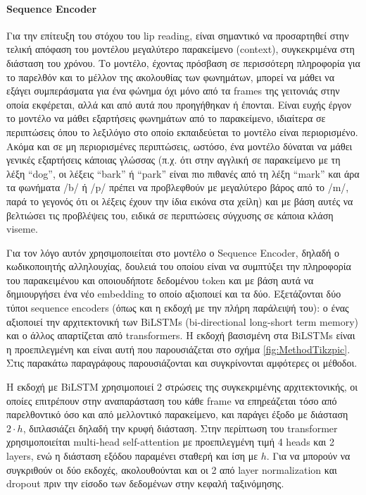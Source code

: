 \paragraph{Sequence Encoder}

Για την επίτευξη του στόχου του lip reading, είναι σημαντικό να προσαρτηθεί στην τελική απόφαση του μοντέλου μεγαλύτερο παρακείμενο (context), συγκεκριμένα στη διάσταση του χρόνου. Το μοντέλο, έχοντας πρόσβαση σε περισσότερη πληροφορία για το παρελθόν και το μέλλον της ακολουθίας των φωνημάτων, μπορεί να μάθει να εξάγει συμπεράσματα για ένα φώνημα όχι μόνο από τα frames της γειτονιάς στην οποία εκφέρεται, αλλά και από αυτά που προηγήθηκαν ή έπονται. Είναι ευχής έργον το μοντέλο να μάθει εξαρτήσεις φωνημάτων από το παρακείμενο, ιδιαίτερα σε περιπτώσεις όπου το λεξιλόγιο στο οποίο εκπαιδεύεται το μοντέλο είναι περιορισμένο. Ακόμα και σε μη περιορισμένες περιπτώσεις, ωστόσο, ένα μοντέλο δύναται να μάθει γενικές εξαρτήσεις κάποιας γλώσσας (π.χ. ότι στην αγγλική σε παρακείμενο με τη λέξη ``dog'', οι λέξεις ``bark'' ή ``park'' είναι πιο πιθανές από τη λέξη ``mark'' και άρα τα φωνήματα /b/ ή /p/ πρέπει να προβλεφθούν με μεγαλύτερο βάρος από το /m/, παρά το γεγονός ότι οι λέξεις έχουν την ίδια εικόνα στα χείλη) και με βάση αυτές να βελτιώσει τις προβλέψεις του, ειδικά σε περιπτώσεις σύγχυσης σε κάποια κλάση viseme. 

Για τον λόγο αυτόν χρησιμοποιείται στο μοντέλο ο Sequence Encoder, δηλαδή ο κωδικοποιητής αλληλουχίας, δουλειά του οποίου είναι να συμπτύξει την πληροφορία του παρακειμένου και οποιουδήποτε δεδομένου token και με βάση αυτά να δημιουργήσει ένα νέο embedding το οποίο αξιοποιεί και τα δύο. Εξετάζονται δύο τύποι sequence encoders (όπως και η εκδοχή με την πλήρη παράλειψή του): ο ένας αξιοποιεί την αρχιτεκτονική των BiLSTMs (bi-directional long-short term memory) και ο άλλος απαρτίζεται από transformers. Η εκδοχή βασισμένη στα BiLSTMs είναι η προεπιλεγμένη και είναι αυτή που παρουσιάζεται στο σχήμα \ref{fig:MethodTikzpic}. Στις παρακάτω παραγράφους παρουσιάζονται και συγκρίνονται αμφότερες οι μέθοδοι.

Η εκδοχή με BiLSTM χρησιμοποιεί 2 στρώσεις της συγκεκριμένης αρχιτεκτονικής, οι οποίες επιτρέπουν στην αναπαράσταση του κάθε frame να επηρεάζεται τόσο από παρελθοντικό όσο και από μελλοντικό παρακείμενο, και παράγει έξοδο με διάσταση $2\cdot h$, διπλασιάζει δηλαδή την κρυφή διάσταση. Στην περίπτωση του transformer χρησιμοποιείται multi-head self-attention με προεπιλεγμένη τιμή 4 heads και 2 layers, ενώ η διάσταση εξόδου παραμένει σταθερή και ίση με $h$. Για να μπορούν να συγκριθούν οι δύο εκδοχές, ακολουθούνται και οι 2 από layer normalization και dropout πριν την είσοδο των δεδομένων στην κεφαλή ταξινόμησης.

